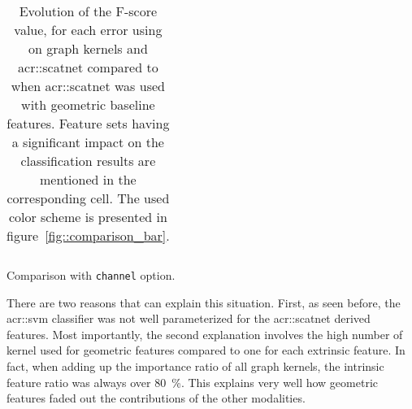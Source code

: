\begin{table}[htbp]
\begin{subtable}{\textwidth}
\begin{tabular}{| c | x{1.1cm} x{1.1cm} x{1.1cm} x{1.1cm} |x{1.1cm} x{1.1cm} x{1.1cm} x{1.1cm} x{1.1cm} |}
                    \hline
                \end{tabular}
                \caption{
                    \label{subtab::gk_scat_svm_comparison_chan}
                    Comparison with \texttt{channel} option.
                }
            \end{subtable}
            \renewcommand{\arraystretch}{1}
            \caption[
                Evolution of the F-score value, for each error using on graph kernels and \gls{acr::scatnet} compared to when \gls{acr::scatnet} was used with geometric baseline features.
            ]{
                \label{tab::gk_scat_svm_comparison}
                Evolution of the F-score value, for each error using on graph kernels and \gls{acr::scatnet} compared to when \gls{acr::scatnet} was used with geometric baseline features.
                Feature sets having a significant impact on the classification results are mentioned in the corresponding cell.
                The used color scheme is presented in figure~\ref{fig::comparison_bar}.
            }
        \end{table}

        There are two reasons that can explain this situation.
        First, as seen before, the \gls{acr::svm} classifier was not well parameterized for the \gls{acr::scatnet} derived features.
        Most importantly, the second explanation involves the high number of kernel used for geometric features compared to one for each extrinsic feature.
        In fact, when adding up the importance ratio of all graph kernels, the intrinsic feature ratio was always over \SI{80}{\percent}.
        This explains very well how geometric features faded out the contributions of the other modalities.\\

